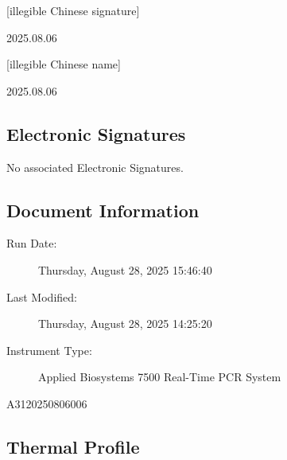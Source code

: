 \documentclass[UTF8,10pt,a4paper,fontset=fandol]{ctexart}
\newcommand{\fieldvalue}[1]{#1}
\newcommand{\handwritten}[1]{#1}
\begin{document}
\handwritten{[illegible Chinese signature]}

\handwritten{2025.08.06}

\handwritten{[illegible Chinese name]}

\handwritten{2025.08.06}

\subsection{Electronic Signatures}

No associated Electronic Signatures.

\subsection{Document Information}

\begin{description}
  \item[Run Date:] %
  \fieldvalue{Thursday, August 28, 2025 15:46:40}

  \item[Last Modified:] %
  \fieldvalue{Thursday, August 28, 2025 14:25:20}

  \item[Instrument Type:] %
  \fieldvalue{Applied Biosystems 7500 Real-Time PCR System}
\end{description}

\fieldvalue{A3120250806006}

\subsection{Thermal Profile}
\end{document}
